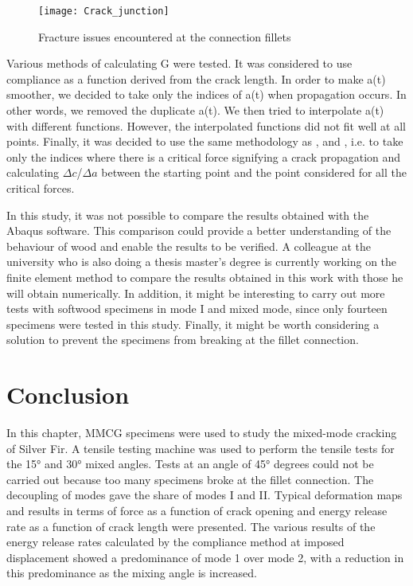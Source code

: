 \begin{figure}[htp]
	\centering
	\texttt{[image: Crack\_junction]}
	\caption{Fracture issues encountered at the connection fillets}
	\label{fig:Crack_junction}
\end{figure}

Various methods of calculating G were tested. It was considered to use compliance as a function derived from the crack length. In order to make a(t) smoother, we decided to take only the indices of a(t) when propagation occurs. In other words, we removed the duplicate a(t). We then tried to interpolate a(t) with different functions. However, the interpolated functions did not fit well at all points.
Finally, it was decided to use the same methodology as \cite{MoutouPitti2008}, \cite{Mambili2018} and  \cite{Odounga2018phd}, i.e. to take only the indices where there is a critical force signifying a crack propagation and calculating $\Delta c$/$\Delta a$ between the starting point and the point considered for all the critical forces.

In this study, it was not possible to compare the results obtained with the Abaqus software. This comparison could provide a better understanding of the behaviour of wood and enable the results to be verified. A colleague at the university who is also doing a thesis master's degree is currently working on the finite element method to compare the results obtained in this work with those he will obtain numerically. In addition, it might be interesting to carry out more tests with softwood specimens in mode I and mixed mode, since only fourteen specimens were tested in this study.
Finally, it might be worth considering a solution to prevent the specimens from breaking at the fillet connection.

\section{Conclusion}

In this chapter, MMCG specimens were used to study the mixed-mode cracking of Silver Fir. A tensile testing machine was used to perform the tensile tests for the 15° and 30° mixed angles. Tests at an angle of 45° degrees could not be carried out because too many specimens broke at the fillet connection. The decoupling of modes gave the share of modes I and II.  Typical deformation maps and results in terms of force as a function of crack opening and energy release rate as a function of crack length were presented. The various results of the energy release rates calculated by the compliance method at imposed displacement showed a predominance of mode 1 over mode 2, with a reduction in this predominance as the mixing angle is increased.